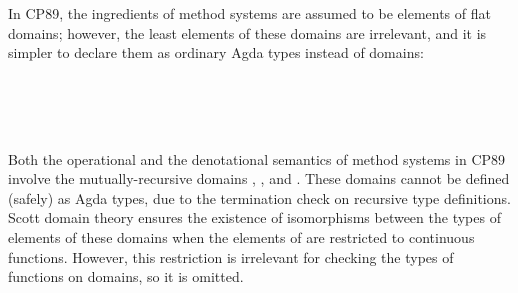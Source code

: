\begin{AgdaAlign}
In CP89, the ingredients of method systems are assumed to be elements of flat domains;
however, the least elements of these domains are irrelevant,
and it is simpler to declare them as ordinary Agda types instead of domains:
%
\begin{code}%
%
\>[4]\AgdaSymbol{(}\AgdaSpace{}%
%
\>[17]\AgdaSymbol{:}\AgdaSpace{}%
\AgdaSpace{}%
\AgdaSymbol{)}%
\>[32]\<%
\\
%
\>[4]\AgdaSymbol{(}\AgdaSpace{}%
%
\>[17]\AgdaSymbol{:}\AgdaSpace{}%
\AgdaSpace{}%
\AgdaSymbol{)}%
\>[32]\<%
\\
%
\>[4]\AgdaSymbol{(}\AgdaSpace{}%
%
\>[17]\AgdaSymbol{:}\AgdaSpace{}%
\AgdaSpace{}%
\AgdaSymbol{)}%
\>[32]\<%
\\
%
\>[4]\AgdaSymbol{(}\AgdaSpace{}%
%
\>[17]\AgdaSymbol{:}\AgdaSpace{}%
\AgdaSpace{}%
\AgdaSymbol{)}%
\>[32]\<%
\end{code}
%
Both the operational and the denotational semantics of method systems in CP89 involve
the mutually-recursive domains , , and .
These domains cannot be defined (safely) as Agda types,
due to the termination check on recursive type definitions.
Scott domain theory ensures the existence of isomorphisms between the types of elements of these domains
when the elements of  are restricted to continuous functions.
However, this restriction is irrelevant for checking the types of functions on domains,
so it is omitted.
%
\begin{code}%
%
\>[4]\AgdaSymbol{(}\AgdaSpace{}%
%
\>[16]\AgdaSymbol{:}\AgdaSpace{}%
\AgdaSpace{}%
\AgdaSymbol{)}%
\>[32]\<%
\\
%
\>[4]\AgdaSymbol{(}\AgdaSpace{}%
%
\>[16]\AgdaSymbol{:}\AgdaSpace{}%
\AgdaSpace{}%
\AgdaSymbol{)}%
\>[32]\<%
\\
%
\>[4]\AgdaSymbol{(}\AgdaSpace{}%
%
\>[16]\AgdaSymbol{:}\AgdaSpace{}%
\AgdaSpace{}%
\AgdaSymbol{)}%
\>[32]\<%
\\
%
\>[4]\AgdaSymbol{(}\AgdaSpace{}%
%
\>[16]\AgdaSymbol{:}\AgdaSpace{}%

\end{code}
\end{AgdaAlign}
